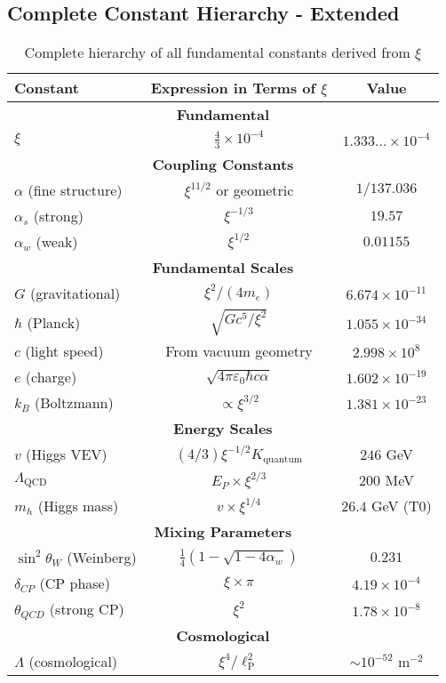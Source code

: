 \documentclass[12pt,a4paper]{article}
\newcommand{\lP}{\ell_{\text{P}}}
\newcommand{\xipar}{\xi}  %
\begin{document}
	\subsection{Complete Constant Hierarchy - Extended}
	
	\begin{table}[h]
		\centering
		\small
		\begin{tabular}{lcc}
			\toprule
			\textbf{Constant} & \textbf{Expression in Terms of $\xipar$} & \textbf{Value} \\
			\midrule
			\multicolumn{3}{c}{\textbf{Fundamental}} \\
			$\xipar$ & $\frac{4}{3} \times 10^{-4}$ & $1.333... \times 10^{-4}$ \\
			\midrule
			\multicolumn{3}{c}{\textbf{Coupling Constants}} \\
			$\alpha$ (fine structure) & $\xipar^{11/2}$ or geometric & $1/137.036$ \\
			$\alpha_s$ (strong) & $\xipar^{-1/3}$ & $19.57$ \\
			$\alpha_w$ (weak) & $\xipar^{1/2}$ & $0.01155$ \\
			\midrule
			\multicolumn{3}{c}{\textbf{Fundamental Scales}} \\
			$G$ (gravitational) & $\xipar^2/(4m_e)$ & $6.674 \times 10^{-11}$ \\
			$\hbar$ (Planck) & $\sqrt{Gc^5/\xipar^2}$ & $1.055 \times 10^{-34}$ \\
			$c$ (light speed) & From vacuum geometry & $2.998 \times 10^8$ \\
			$e$ (charge) & $\sqrt{4\pi\varepsilon_0\hbar c\alpha}$ & $1.602 \times 10^{-19}$ \\
			$k_B$ (Boltzmann) & $\propto \xipar^{3/2}$ & $1.381 \times 10^{-23}$ \\
			\midrule
			\multicolumn{3}{c}{\textbf{Energy Scales}} \\
			$v$ (Higgs VEV) & $(4/3)\xipar^{-1/2}K_{\text{quantum}}$ & $246$ GeV \\
			$\Lambda_{\text{QCD}}$ & $E_P \times \xipar^{2/3}$ & $200$ MeV \\
			$m_h$ (Higgs mass) & $v \times \xipar^{1/4}$ & $26.4$ GeV (T0) \\
			\midrule
			\multicolumn{3}{c}{\textbf{Mixing Parameters}} \\
			$\sin^2\theta_W$ (Weinberg) & $\frac{1}{4}(1-\sqrt{1-4\alpha_w})$ & $0.231$ \\
			$\delta_{CP}$ (CP phase) & $\xipar \times \pi$ & $4.19 \times 10^{-4}$ \\
			$\theta_{QCD}$ (strong CP) & $\xipar^2$ & $1.78 \times 10^{-8}$ \\
			\midrule
			\multicolumn{3}{c}{\textbf{Cosmological}} \\
			$\Lambda$ (cosmological) & $\xipar^4/\lP^2$ & $\sim 10^{-52}$ m$^{-2}$ \\
			\bottomrule
		\end{tabular}
		\caption{Complete hierarchy of all fundamental constants derived from $\xipar$}
	\end{table}
	
\end{document}
